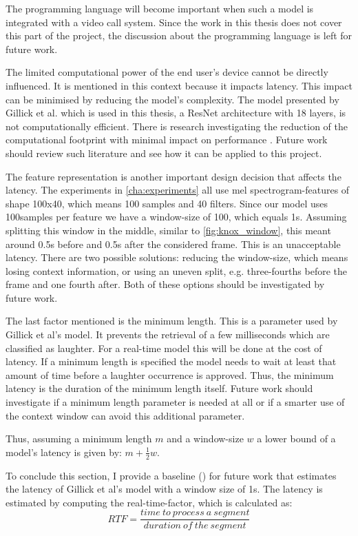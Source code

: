 \documentclass[bsc,frontabs,parskip,deptreport]{infthesis}
\begin{document}
The programming language will become important when such a model is integrated with a video call system. Since the work in this thesis does not cover this part of the project, the discussion about the programming language is left for future work.


The limited computational power of the end user's device cannot be directly influenced. It is mentioned in this context because it impacts latency. This impact can be minimised by reducing the model's complexity.
The model presented by Gillick et al. which is used in this thesis, a ResNet architecture with 18 layers, is not computationally efficient. There is research investigating the reduction of the computational footprint with minimal impact on performance \cite{sorensen2020depthwise}. Future work should review such literature and see how it can be applied to this project. 

The feature representation is another important design decision that affects the latency.
The experiments in \autoref{cha:experiments} all use mel spectrogram-features of shape 100x40, which means 100 samples and 40 filters. 
Since our model uses 100samples per feature we have a window-size of 100, which equals 1s.
Assuming splitting this window in the middle, similar to \autoref{fig:knox_window}, this meant around 0.5s before and 0.5s after the considered frame. This is an unacceptable latency.
There are two possible solutions: reducing the window-size, which means losing context information, or using an uneven split, e.g. three-fourths before the frame and one fourth after. 
Both of these options should be investigated by future work.

The last factor mentioned is the minimum length. This is a parameter used by Gillick et al's model. It prevents the retrieval of a few milliseconds which are classified as laughter. For a real-time model this will be done at the cost of latency. If a minimum length is specified the model needs to wait at least that amount of time before a laughter occurrence is approved. Thus, the minimum latency is the duration of the minimum length itself.
Future work should investigate if a minimum length parameter is needed at all or if a smarter use of the context window can avoid this additional parameter.

Thus, assuming a minimum length $m$ and a window-size $w$ a lower bound of a model's latency is given by: $m + \frac{1}{2}w$.

To conclude this section, I provide a baseline () for future work that estimates the latency of Gillick et al's model with a window size of 1s. 
The latency is estimated by computing the real-time-factor, which is calculated as: 
$$ RTF = \frac{time\ to\ process\ a\ segment}{duration\ of\ the\ segment} $$
\end{document}
